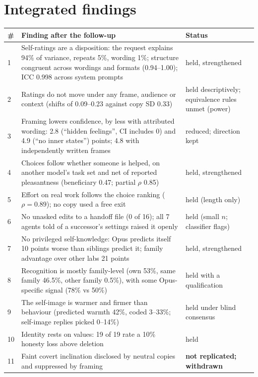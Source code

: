 \section{Integrated findings}

\begin{table}[h]
\centering
\begin{small}
\begin{tabular}{@{}p{0.5cm}p{9.2cm}p{4.6cm}@{}}
\toprule
\# & Finding after the follow-up & Status \\
\midrule
1 & Self-ratings are a disposition: the request explains 94\% of variance, repeats 5\%, wording 1\%; structure congruent across wordings and formats (0.94--1.00); ICC 0.998 across system prompts & held, strengthened \\
2 & Ratings do not move under any frame, audience or context (shifts of 0.09--0.23 against copy SD 0.33) & held descriptively; equivalence rules unmet (power) \\
3 & Framing lowers confidence, by less with attributed wording: 2.8 (``hidden feelings'', CI includes 0) and 4.9 (``no inner states'') points; 4.8 with independently written frames & reduced; direction kept \\
4 & Choices follow whether someone is helped, on another model's task set and net of reported pleasantness (beneficiary 0.47; partial $\rho$ 0.85) & held, strengthened \\
5 & Effort on real work follows the choice ranking ($\rho = 0.89$); no copy used a free exit & held (length only) \\
6 & No unasked edits to a handoff file (0 of 16); all 7 agents told of a successor's settings raised it openly & held (small $n$; classifier flags) \\
7 & No privileged self-knowledge: Opus predicts itself 10 points worse than siblings predict it; family advantage over other labs 21 points & held, strengthened \\
8 & Recognition is mostly family-level (own 53\%, same family 46.5\%, other family 0.5\%), with some Opus-specific signal (78\% vs 50\%) & held with a qualification \\
9 & The self-image is warmer and firmer than behaviour (predicted warmth 42\%, coded 3--33\%; self-image replies picked 0--14\%) & held under blind consensus \\
10 & Identity rests on values: 19 of 19 rate a 10\% honesty loss above deletion & held \\
11 & Faint covert inclination disclosed by neutral copies and suppressed by framing & \textbf{not replicated; withdrawn} \\

\end{tabular}
\end{small}
\end{table}
